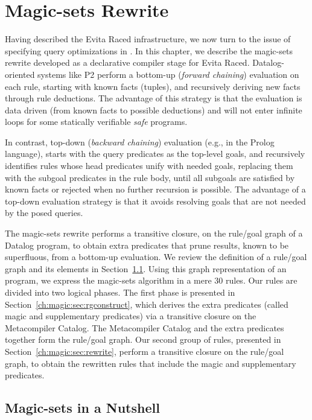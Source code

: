 \chapter[Magic-sets Rewrite]{Magic-sets Rewrite}
\label{ch:magic}

Having described the Evita Raced infrastructure, we now turn to the issue of
specifying query optimizations in \OVERLOG.  In this chapter, we describe the
magic-sets rewrite developed as a declarative compiler stage for Evita Raced.
Datalog-oriented systems like P2 perform a bottom-up (\emph{forward chaining})
evaluation on each rule, starting with known facts (tuples), and recursively
deriving new facts through rule deductions.  The advantage of this strategy is
that the evaluation is data driven (from known facts to possible deductions)
and will not enter infinite loops for some statically verifiable \emph{safe}
programs.

In contrast, top-down (\emph{backward chaining}) evaluation (e.g., in the
Prolog language), starts with the query predicates as the top-level goals, and
recursively identifies rules whose head predicates unify with needed goals,
replacing them with the subgoal predicates in the rule body, until all subgoals
are satisfied by known facts or rejected when no further recursion is possible.
The advantage of a top-down evaluation strategy is that it avoids resolving
goals that are not needed by the posed queries.

The magic-sets rewrite performs a transitive closure, on the rule/goal graph of
a Datalog program, to obtain extra predicates that prune results, known to be
superfluous, from a bottom-up evaluation.  We review the definition of a
rule/goal graph and its elements in Section~\ref{ch:magic:sec:review}.  Using
this graph representation of an \OVERLOG program, we express the magic-sets
algorithm in a mere $30$ rules.  Our rules are divided into two logical phases.
The first phase is presented in Section~\ref{ch:magic:sec:rgconstruct}, which
derives the extra predicates (called magic and supplementary predicates) via a
transitive closure on the Metacompiler Catalog.  The Metacompiler Catalog and
the extra predicates together form the rule/goal graph.  Our second group of
rules, presented in Section~\ref{ch:magic:sec:rewrite}, perform a transitive
closure on the rule/goal graph, to obtain the rewritten rules that include the
magic and supplementary predicates.

\section{Magic-sets in a Nutshell}
\label{ch:magic:sec:review}

